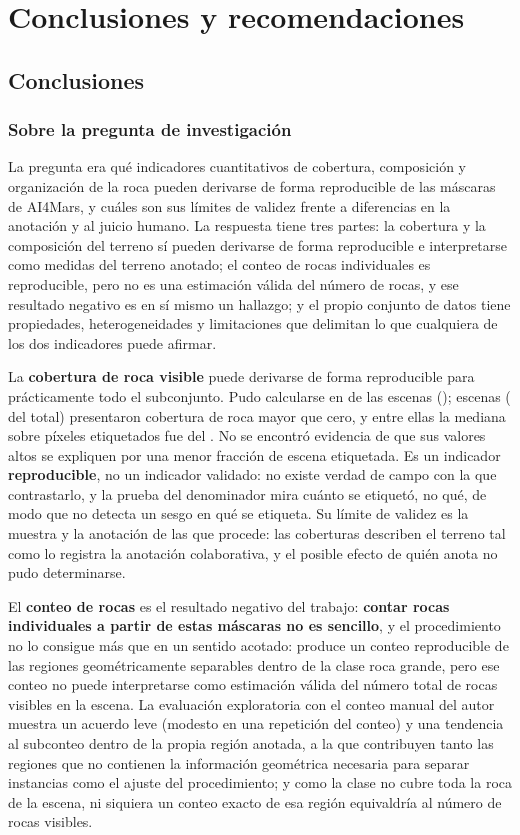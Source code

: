 \chapter{Conclusiones y recomendaciones}
\label{cap:conclusiones}

\section{Conclusiones}

\subsection{Sobre la pregunta de investigación}

La pregunta era qué indicadores cuantitativos de cobertura, composición y organización de la
roca pueden derivarse de forma reproducible de las máscaras de AI4Mars, y cuáles son sus límites de validez
frente a diferencias en la anotación y al juicio humano. La respuesta tiene tres partes: la
cobertura y la composición del terreno sí pueden derivarse de forma reproducible e
interpretarse como medidas del terreno anotado; el conteo de rocas individuales es reproducible, pero no es una estimación válida del
número de rocas, y ese resultado negativo es en sí mismo un hallazgo; y el propio conjunto de datos tiene
propiedades, heterogeneidades y limitaciones que delimitan lo que cualquiera de los dos
indicadores puede afirmar.

La \textbf{cobertura de roca visible} puede derivarse de forma reproducible para prácticamente
todo el subconjunto. Pudo calcularse en \cNCobCalc{} de las \cNEscenas{} escenas
(\cPctCobCalc); \cNCobPos{} escenas (\cPctCobPos{} del total) presentaron cobertura de roca
mayor que cero, y entre ellas la mediana sobre píxeles etiquetados fue del \cCobMedVal. No se
encontró evidencia de que sus valores altos se expliquen por una menor fracción de escena
etiquetada. Es un indicador \textbf{reproducible}, no un indicador validado: no existe verdad
de campo con la que contrastarlo, y la prueba del denominador mira cuánto se etiquetó, no qué, de
modo que no detecta un sesgo en qué se etiqueta. Su límite de validez es la muestra y la
anotación de las que procede: las coberturas describen el terreno tal como lo registra la
anotación colaborativa, y el posible efecto de quién anota no pudo determinarse.

El \textbf{conteo de rocas} es el resultado negativo del trabajo: \textbf{contar rocas
individuales a partir de estas máscaras no es sencillo}, y el procedimiento no lo consigue más
que en un sentido acotado: produce un conteo reproducible de las regiones
geométricamente separables dentro de la clase roca grande, pero ese conteo no puede
interpretarse como estimación válida del número total de rocas visibles en la escena. La
evaluación exploratoria con el conteo manual del autor muestra un acuerdo leve (modesto en una
repetición del conteo) y una tendencia al subconteo dentro de la propia región anotada, a la que
contribuyen tanto las regiones que no contienen la información geométrica necesaria para separar
instancias como el ajuste del procedimiento; y como la clase no cubre toda la roca de la escena, ni
siquiera un conteo exacto de esa región equivaldría al número de rocas visibles.


